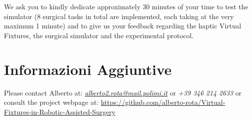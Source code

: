 \documentclass{article}
\begin{document}
\noindent We ask you to kindly dedicate approximately 30 minutes of your time to test the simulator (8 surgical tasks in total are implemented, each taking at the very maximum 1 minute) and to give us your feedback regarding the haptic Virtual Fixtures, the surgical simulator and the experimental protocol.

\section{Informazioni Aggiuntive}
Please contact Alberto at: \textit{\href{mailto:alberto2.rota@mail.polimi.it}{alberto2.rota@mail.polimi.it}} or \textit{+39 346 214 2633}
\newline or consult the project webpage at: \href{https://github.com/alberto-rota/Virtual-Fixtures-in-Robotic-Assisted-Surgery}{https://github.com/alberto-rota/Virtual-Fixtures-in-Robotic-Assisted-Surgery} 


\end{document}
